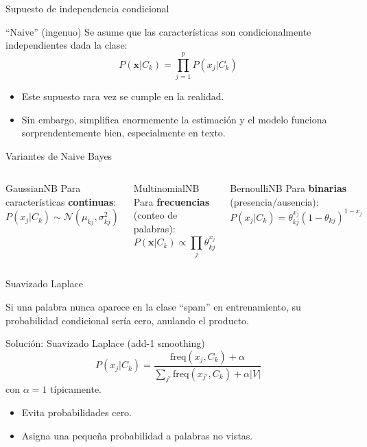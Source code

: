 \documentclass[aspectratio=169, 10pt, xcolor=table]{beamer}
\begin{document}
\begin{frame}{Supuesto de independencia condicional}
    \begin{alertblock}{``Naive'' (ingenuo)}
        Se asume que las características son condicionalmente independientes dada la clase:
        \[
        P(\mathbf{x}|C_k) = \prod_{j=1}^p P(x_j|C_k)
        \]
    \end{alertblock}
    \begin{itemize}
        \item Este supuesto rara vez se cumple en la realidad.
        \item Sin embargo, simplifica enormemente la estimación y el modelo funciona sorprendentemente bien, especialmente en texto.
    \end{itemize}
\end{frame}

\begin{frame}{Variantes de Naive Bayes}
    \begin{columns}[t]
        \begin{block}{GaussianNB}
            Para características \textbf{continuas}:
            \[
            P(x_j|C_k) \sim \mathcal{N}(\mu_{kj}, \sigma_{kj}^2)
            \]
        \end{block}
        \begin{block}{MultinomialNB}
            Para \textbf{frecuencias} (conteo de palabras):
            \[
            P(\mathbf{x}|C_k) \propto \prod_j \theta_{kj}^{x_j}
            \]
        \end{block}
        \begin{block}{BernoulliNB}
            Para \textbf{binarias} (presencia/ausencia):
            \[
            P(x_j|C_k) = \theta_{kj}^{x_j}(1-\theta_{kj})^{1-x_j}
            \]
        \end{block}
    \end{columns}
\end{frame}

\begin{frame}{Suavizado Laplace}
    \begin{problem}
        Si una palabra nunca aparece en la clase ``spam'' en entrenamiento, su probabilidad condicional sería cero, anulando el producto.
    \end{problem}
    \begin{block}{Solución: Suavizado Laplace (add-1 smoothing)}
        \[
        P(x_j|C_k) = \frac{\text{freq}(x_j, C_k) + \alpha}{\sum_{j'} \text{freq}(x_{j'}, C_k) + \alpha |V|}
        \]
        con $\alpha = 1$ típicamente.
    \end{block}
    \begin{itemize}
        \item Evita probabilidades cero.
        \item Asigna una pequeña probabilidad a palabras no vistas.
    \end{itemize}
\end{frame}
\end{document}
